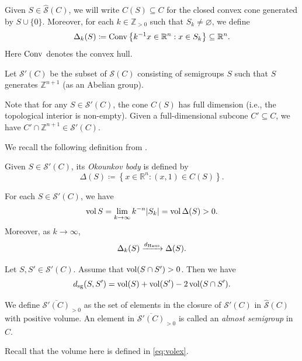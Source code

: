 Given $S\in \hat{\mathcal{S}}(C)$, we will write $C(S)\subseteq C$ for the closed convex cone generated by $S\cup \{0\}$. Moreover, for each $k\in \mathbb{Z}_{>0}$ such that $S_k\neq\varnothing$, we define
\[
\Delta_k(S)\coloneqq \mathrm{Conv} \left\{k^{-1}x\in \mathbb{R}^n:x\in S_k \right\}\subseteq \mathbb{R}^n.
\]
Here $\mathrm{Conv}$ denotes the convex hull.
\begin{definition}\label{def:Okounkov:L69}
    Let $\mathcal{S}'(C)$ be the subset of $\mathcal{S}(C)$ consisting of semigroups $S$ such that $S$ generates $\mathbb{Z}^{n+1}$ (as an Abelian group).
\end{definition}
Note that for any $S\in \mathcal{S}'(C)$, the cone $C(S)$ has full dimension (i.e., the topological interior is non-empty). Given a full-dimensional subcone $C'\subseteq C$, we have $C'\cap \mathbb{Z}^{n+1}\in \mathcal{S}'(C)$.


We recall the following definition from \cite{KK12}.
\begin{definition}\label{def:Okokk}
 Given $S\in \mathcal{S}'(C)$, its \emph{Okounkov body} is defined by
\[
\Delta(S)\coloneqq \left\{x\in \mathbb{R}^n:(x,1)\in C(S) \right\}.
\]
\end{definition}

\begin{theorem}\label{thm:HausOkoun}
	For each $S\in \mathcal{S}'(C)$, we have
	\begin{equation}\label{eq:volWvolDelta}
		\operatorname{vol} S=\lim_{k\to\infty} k^{-n}|S_k|=\operatorname{vol} \Delta(S)>0.
	\end{equation}
    Moreover, as $k\to\infty$,
	\begin{equation}\label{eq:HausconvDeltaGLS}
		\Delta_{k}(S)\xrightarrow{d_{\mathrm{Haus}}}\Delta(S).
	\end{equation}
\end{theorem}
\begin{corollary}\label{cor:dist}
    Let $S,S'\in \mathcal{S}'(C)$. Assume that $\operatorname{vol} (S\cap S')>0$. Then we have
    \[
    d_{\mathrm{sg}}(S,S')=\operatorname{vol}(S)+\operatorname{vol}(S')-2\operatorname{vol}(S\cap S').
    \]
\end{corollary}

\begin{definition}\label{def:SpCbar}
    We define $\overline{\mathcal{S}'(C)}_{>0}$ as the set of elements in the closure of $\mathcal{S}'(C)$ in $\hat{\mathcal{S}}(C)$ with positive volume. An element in $\overline{\mathcal{S}'(C)}_{>0}$ is called an \emph{almost semigroup} in $C$.
\end{definition}
Recall that the volume here is defined in \eqref{eq:volex}.


